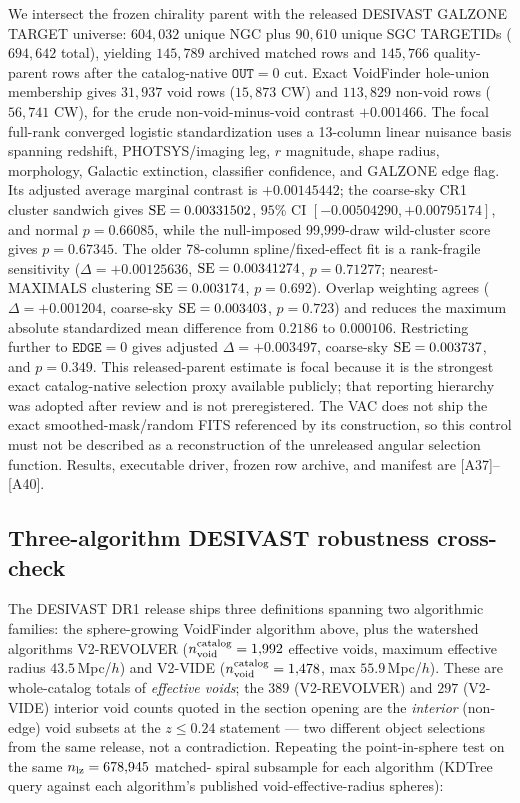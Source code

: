 \documentclass[twocolumn,linenumbers]{aastex702}
\begin{document}
We
intersect the frozen chirality parent with the released DESIVAST GALZONE
TARGET universe: $604{,}032$ unique NGC plus $90{,}610$ unique SGC TARGETIDs
($694{,}642$ total), yielding $145{,}789$ archived matched rows and
$145{,}766$ quality-parent rows after the catalog-native $\mathtt{OUT}=0$ cut.
Exact VoidFinder hole-union membership gives $31{,}937$ void rows
($15{,}873$ CW) and $113{,}829$ non-void rows ($56{,}741$ CW), for the crude
non-void-minus-void contrast $+0.001466$. The focal full-rank converged
logistic standardization uses a 13-column linear nuisance basis spanning
redshift, PHOTSYS/imaging leg, $r$ magnitude, shape radius, morphology,
Galactic extinction, classifier confidence, and GALZONE edge flag. Its
adjusted average marginal contrast is $+0.00145442$; the coarse-sky CR1
cluster sandwich gives ${\rm SE}=0.00331502$, $95\%$ CI
$[-0.00504290,+0.00795174]$, and normal $p=0.66085$, while the
null-imposed 99,999-draw wild-cluster score gives $p=0.67345$.
The older 78-column spline/fixed-effect fit is a rank-fragile sensitivity
($\Delta=+0.00125636$, ${\rm SE}=0.00341274$, $p=0.71277$; nearest-MAXIMALS
clustering ${\rm SE}=0.003174$, $p=0.692$). Overlap weighting agrees
($\Delta=+0.001204$, coarse-sky ${\rm SE}=0.003403$, $p=0.723$) and reduces
the maximum absolute standardized mean difference from $0.2186$ to
$0.000106$. Restricting further to $\mathtt{EDGE}=0$ gives adjusted
$\Delta=+0.003497$, coarse-sky ${\rm SE}=0.003737$, and $p=0.349$.
This released-parent estimate is focal because it is the strongest exact
catalog-native selection proxy available publicly; that reporting hierarchy
was adopted after review and is not preregistered. The
VAC does not ship the exact
smoothed-mask/random FITS referenced by its construction, so this control
must not be described as a reconstruction of the unreleased angular
selection function. Results, executable driver, frozen row archive, and
manifest are [A37]--[A40].

\subsection{Three-algorithm DESIVAST robustness cross-check}\label{sec:desivast_three_algo}

The DESIVAST DR1 release ships three definitions spanning two algorithmic families: the
sphere-growing VoidFinder algorithm above, plus the watershed
algorithms V2-REVOLVER ($n_{\rm void}^{\rm catalog} = 1{,}992$ effective
voids, maximum effective radius $43.5\,$Mpc/$h$) and V2-VIDE
($n_{\rm void}^{\rm catalog} = 1{,}478$, max $55.9\,$Mpc/$h$). These are
whole-catalog totals of \emph{effective voids}; the $389$ (V2-REVOLVER)
and $297$ (V2-VIDE) interior void counts quoted in the section opening are the
\emph{interior} (non-edge) void subsets at the $z \le 0.24$ statement
— two different object selections from the same release, not a
contradiction. Repeating
the point-in-sphere test on the same $n_{\rm lz} = 678{,}945$ matched-
spiral subsample for each algorithm (KDTree query against each
algorithm's published void-effective-radius spheres):
\end{document}
